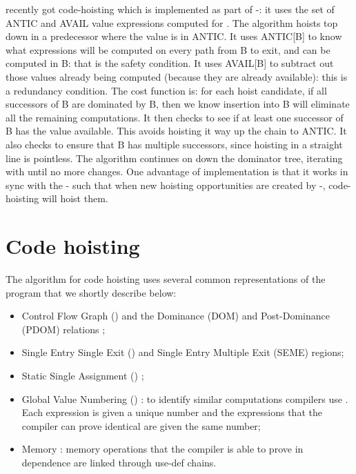 \documentclass{sig-alternate}
\begin{document}
\GCC{} recently got code-hoisting \cite{GCCCodeHoisting} which is implemented as
part of \GVN{}-\PRE{}: it uses the set of ANTIC and AVAIL value expressions computed
for \PRE{}.  The algorithm hoists top down in a predecessor where the value is in
ANTIC.  It uses ANTIC[B] to know what expressions will be computed on every
path from B to exit, and can be computed in B: that is the safety condition.  It
uses AVAIL[B] to subtract out those values already being computed (because they
are already available): this is a redundancy condition.  The cost function is:
for each hoist candidate, if all successors of B are dominated by B, then we
know insertion into B will eliminate all the remaining computations.  It then
checks to see if at least one successor of B has the value available.  This
avoids hoisting it way up the chain to ANTIC.  It also checks to ensure that B
has multiple successors, since hoisting in a straight line is pointless.  The
algorithm continues on down the dominator tree, iterating with \PRE{} until no more
changes.  One advantage of \GCC{} implementation is that it works in sync with the
\GVN{}-\PRE{} such that when new hoisting opportunities are created by \GVN{}-\PRE{},
code-hoisting will hoist them.

\newpage

\section{Code hoisting}

The algorithm for code hoisting uses several common representations of the
program that we shortly describe below:
\begin{itemize}
\item Control Flow Graph (\CFG{}) and the Dominance (DOM) and Post-Dominance (PDOM)
  relations \cite{dragonbook};
\item Single Entry Single Exit (\SESE{}) \cite{sese} and Single Entry Multiple Exit
  (SEME) regions;
\item Static Single Assignment (\SSA{}) \cite{cytron};
\item Global Value Numbering (\GVN{}) \cite{rosen1988global,click1995global}: to
  identify similar computations compilers use \GVN{}.  Each expression is given a
  unique number and the expressions that the compiler can prove identical are
  given the same number;
\item Memory \SSA{} \cite{novillo2007memory}: memory operations that the compiler
  is able to prove in dependence are linked through use-def chains.
\end{itemize}
\end{document}
